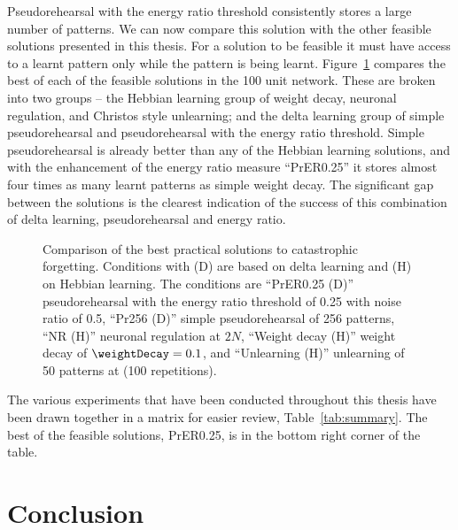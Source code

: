 Pseudorehearsal with the energy ratio threshold consistently stores a large number of patterns.  We can now compare this solution with the other feasible solutions presented in this thesis.  For a solution to be feasible it must have access to a learnt pattern only while the pattern is being learnt. Figure~\ref{fig:AllComp} compares the best of each of the feasible solutions in the 100 unit  network.  These are broken into two groups -- the Hebbian learning group of weight decay, neuronal regulation, and Christos style unlearning; and the delta learning group of simple pseudorehearsal and pseudorehearsal with the energy ratio threshold.  Simple pseudorehearsal is already better than any of the Hebbian learning solutions, and with the enhancement of the energy ratio measure ``PrER0.25\noiseConst{}'' it stores almost four times as many learnt patterns as simple weight decay.  The significant gap between the solutions is the clearest indication of the success of this combination of delta learning, pseudorehearsal and energy ratio.

\begin{figure}[p]
\center
\small
	
	\caption{Comparison of the best practical solutions to catastrophic forgetting.  Conditions with (D) are based on delta learning and (H) on Hebbian learning. The conditions are ``PrER0.25\noiseConst{} (D)'' pseudorehearsal with the energy ratio threshold of 0.25 with noise ratio of 0.5, ``Pr256 (D)'' simple pseudorehearsal of 256 patterns, ``NR (H)'' neuronal regulation at $2N$, ``Weight decay (H)'' weight decay of $\weightDecay=0.1$, and ``Unlearning (H)'' unlearning of 50 patterns at  (100 repetitions).}
	\label{fig:AllComp}
\end{figure}

The various experiments that have been conducted throughout this thesis have been drawn together in a matrix for easier review, Table~\ref{tab:summary}. The best of the feasible solutions, PrER0.25\noiseConst{}, is in the bottom right corner of the table.  


\begin{table}
	\scalebox{0.9}{}
	\caption{Matrix of experimental conditions}
	\label{tab:summary}
\end{table}


\section{Conclusion}


